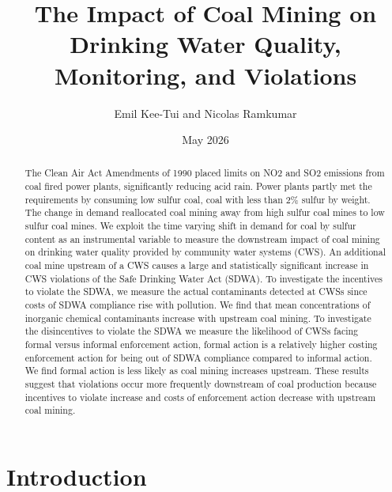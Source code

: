 \documentclass{article}
\begin{document}
\title{The Impact of Coal Mining on Drinking Water Quality, Monitoring, and Violations}
\author[1]{Emil Kee-Tui and Nicolas Ramkumar}
\date{May 2026}
\maketitle
\thispagestyle{empty}
\doublespacing

\begin{center}\begin{abstract}
		\noindent The Clean Air Act Amendments of 1990 placed limits on NO2 and SO2 emissions from coal fired power plants, significantly reducing acid rain. Power plants partly met the requirements by consuming low sulfur coal, coal with less than 2\% sulfur by weight. The change in demand reallocated coal mining away from high sulfur coal mines to low sulfur coal mines. We exploit the time varying shift in demand for coal by sulfur content as an instrumental variable to measure the downstream impact of coal mining on drinking water quality provided by community water systems (CWS). An additional coal mine upstream of a CWS causes a large and statistically significant increase in CWS violations of the Safe Drinking Water Act (SDWA). To investigate the incentives to violate the SDWA, we measure the actual contaminants detected at CWSs since costs of SDWA compliance rise with pollution. We find that mean concentrations of inorganic chemical contaminants increase with upstream coal mining. To investigate the disincentives to violate the SDWA we measure the likelihood of CWSs facing formal versus informal enforcement action, formal action is a relatively higher costing enforcement action for being out of SDWA compliance compared to informal action. We find formal action is less likely as coal mining increases upstream. These results suggest that violations occur more frequently downstream of coal production because incentives to violate increase and costs of enforcement action decrease with upstream coal mining.

\end{abstract}\end{center}
	
\newpage
\doublespacing


\section{Introduction}
\end{document}
